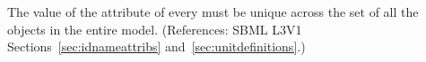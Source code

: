 The value of the  attribute of every \UnitDefinition must be
unique across the set of all the \UnitDefinition{} objects in the entire
model.  (References: SBML L3V1 
Sections~\ref{sec:idnameattribs} and~\ref{sec:unitdefinitions}.)
